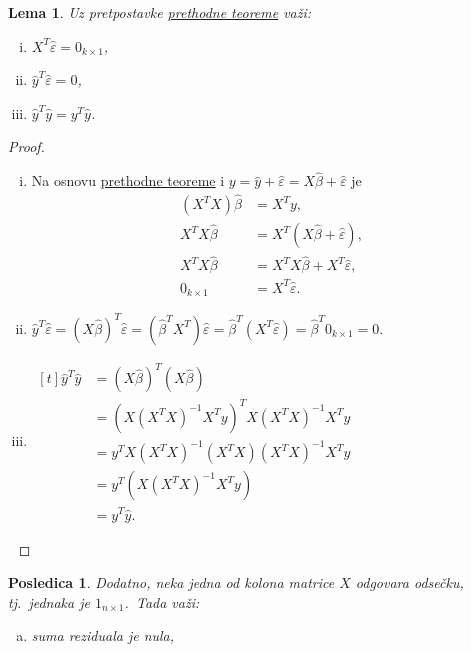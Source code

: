 \documentclass[12pt,a4paper,titlepage,oneside]{article}
\numberwithin{equation}{section}
\numberwithin{figure}{section}
\numberwithin{table}{section}
\newtheorem{lem}[thm]{Lema}
\newtheorem{posl}[thm]{Posledica}
\theoremstyle{definition}
\theoremstyle{remark}
\begin{document}
\begin{appendices}
\begin{lem}\label{lema}
	Uz pretpostavke \hyperref[teorema]{prethodne teoreme} važi:
	\begin{enumerate}[(i)]
		\item $X^T \hat{\varepsilon} = 0_{k\times 1}$,
		
		\item $\hat{y}^T \hat{\varepsilon} = 0$,
		
		\item $\hat{y}^T \hat{y} = y^T \hat{y}$.
	\end{enumerate}
\end{lem}

\begin{proof}
	\begin{enumerate}[(i)]
		\item Na osnovu \hyperref[teorema]{prethodne teoreme} i $y = \hat{y} + \hat{\varepsilon} = X\hat{\beta} + \hat{\varepsilon}$ je
		\begin{align*}
		(X^T X)\hat{\beta} &= X^T y,\\
		X^T X\hat{\beta} &= X^T (X\hat{\beta} + \hat{\varepsilon}),\\
		X^T X\hat{\beta} &= X^T X\hat{\beta} + X^T \hat{\varepsilon},\\
		0_{k\times 1} &= X^T \hat{\varepsilon}.
		\end{align*}
		
		\item $\hat{y}^T \hat{\varepsilon} = (X\hat{\beta})^T \hat{\varepsilon} = (\hat{\beta}^T X^T) \hat{\varepsilon} = \hat{\beta}^T (X^T \hat{\varepsilon}) = \hat{\beta}^T 0_{k\times 1} = 0$.
		
		\item
		$\begin{aligned}[t]
		\hat{y}^T \hat{y} &= (X\hat{\beta})^T (X\hat{\beta})\\
		&= (X (X^T X)^{-1} X^T y)^T X (X^T X)^{-1} X^T y\\
		&= y^T X (X^T X)^{-1} (X^T X) (X^T X)^{-1} X^T y\\
		&= y^T (X (X^T X)^{-1} X^T y)\\
		&= y^T \hat{y}.
		\end{aligned}$
	\end{enumerate}\vspace{-13pt}
	
	$\phantom{.}$
\end{proof}

\begin{posl}\label{posledica}
	Dodatno, neka jedna od kolona matrice $X$ odgovara odsečku, tj.\ jednaka je $1_{n\times 1}$.\ Tada važi:
	\begin{enumerate}[(a)]
		\item suma reziduala je nula,
		

\end{enumerate}
\end{posl}
\end{appendices}
\end{document}
